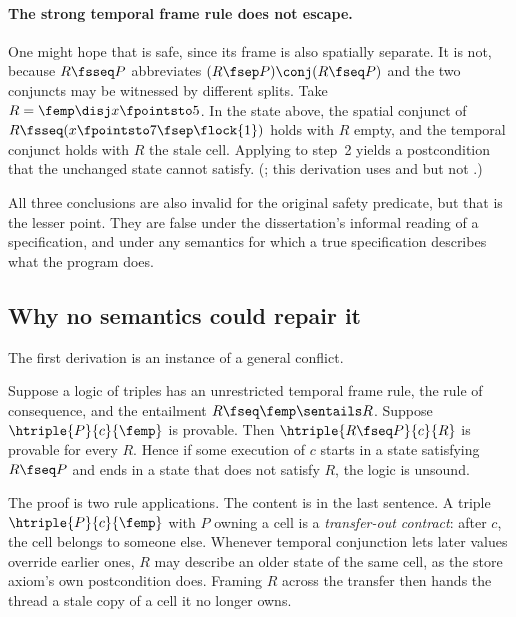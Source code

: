 \paragraph{The strong temporal frame rule does not escape.}
One might hope that  is safe, since its frame is also
spatially separate. It is not, because $R \fsseq P$ abbreviates
$(R \fsep P) \conj (R \fseq P)$ and the two conjuncts may be witnessed by
different splits. Take $R = \femp \disj x \fpointsto 5$. In the state above,
the spatial conjunct of $R \fsseq (x \fpointsto 7 \fsep \flock{1})$ holds
with $R$ empty, and the temporal conjunct holds with $R$ the stale cell.
Applying  to step~2 yields a postcondition that the unchanged
state cannot satisfy. (; this
derivation uses  and  but not .)

All three conclusions are also invalid for the original safety predicate,
but that is the lesser point. They are false under the
dissertation's informal reading of a specification, and under any semantics
for which a true specification describes what the program does.

\subsection{Why no semantics could repair it}
\label{sec:trilemma}

The first derivation is an instance of a general conflict.

\begin{proposition}
\label{prop:trilemma}
Suppose a logic of triples has an unrestricted temporal frame rule, the
rule of consequence, and the entailment $R \fseq \femp \sentails R$.
Suppose $\htriple{P}{c}{\femp}$ is provable. Then $\htriple{R \fseq P}{c}{R}$
is provable for every $R$. Hence if some execution of $c$ starts in a state
satisfying $R \fseq P$ and ends in a state that does not satisfy $R$, the
logic is unsound.
\end{proposition}

The proof is two rule applications. The content is in the last sentence. A
triple $\htriple{P}{c}{\femp}$ with $P$ owning a cell is a \emph{transfer-out
contract}: after $c$, the cell belongs to someone else. Whenever temporal
conjunction lets later values override earlier ones, $R$ may describe an
older state of the same cell, as the store axiom's own postcondition does.
Framing $R$ across the transfer then hands the thread a stale copy of a
cell it no longer owns.

